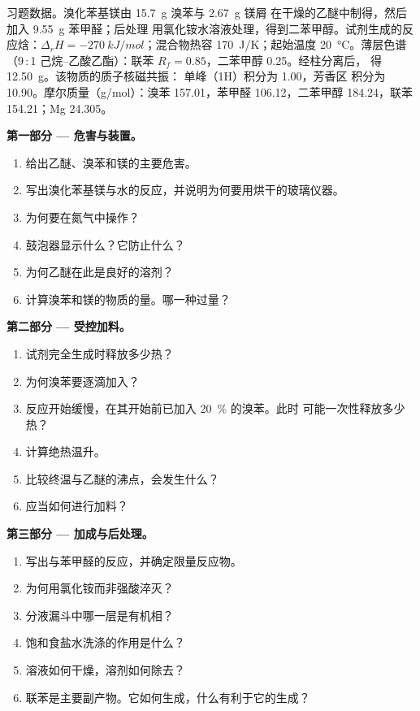 \begin{problem}
\label{pb:b2:lab-techniques-2:1}
习题数据。溴化苯基镁由 \qty{15.7}{g} 溴苯与 \qty{2.67}{g} 镁屑
在干燥的乙醚中制得，然后加入 \qty{9.55}{g} 苯甲醛；后处理
用氯化铵水溶液处理，得到二苯甲醇。试剂生成的反应焓：$\Delta_rH =
\qty{-270}{kJ/mol}$；混合物热容 \qty{170}{J/K}；起始温度 \qty{20}{\degreeCelsius}。薄层色谱
（9\,:\,1 己烷–乙酸乙酯）：联苯 $R_f = 0.85$，二苯甲醇 0.25。经柱分离后，
得 \qty{12.50}{g}。该物质的质子核磁共振： 单峰（1H）积分为 1.00，芳香区
积分为 10.90。摩尔质量（\unit{g/mol}）：溴苯 157.01，苯甲醛 106.12，二苯甲醇
184.24，联苯 154.21；Mg 24.305。

\medskip
\noindent\textbf{第一部分 --- 危害与装置。}
\begin{enumerate}
  \item 给出乙醚、溴苯和镁的主要危害。
  \item 写出溴化苯基镁与水的反应，并说明为何要用烘干的玻璃仪器。
  \item 为何要在氮气中操作？
  \item 鼓泡器显示什么？它防止什么？
  \item 为何乙醚在此是良好的溶剂？
  \item 计算溴苯和镁的物质的量。哪一种过量？
\end{enumerate}

\medskip
\noindent\textbf{第二部分 --- 受控加料。}
\begin{enumerate}[resume]
  \item 试剂完全生成时释放多少热？
  \item 为何溴苯要逐滴加入？
  \item 反应开始缓慢，在其开始前已加入 20~\% 的溴苯。此时
        可能一次性释放多少热？
  \item 计算绝热温升。
  \item 比较终温与乙醚的沸点，会发生什么？
  \item 应当如何进行加料？
\end{enumerate}

\medskip
\noindent\textbf{第三部分 --- 加成与后处理。}
\begin{enumerate}[resume]
  \item 写出与苯甲醛的反应，并确定限量反应物。
  \item 为何用氯化铵而非强酸淬灭？
  \item 分液漏斗中哪一层是有机相？
  \item 饱和食盐水洗涤的作用是什么？
  \item 溶液如何干燥，溶剂如何除去？
  \item 联苯是主要副产物。它如何生成，什么有利于它的生成？
\end{enumerate}


\end{problem}
